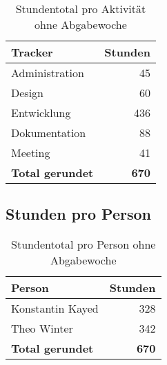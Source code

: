 \begin{table}[H]
\begin{center}
\begin{tabularx}{5.5cm}{ l | r }
\textbf{Tracker} & \textbf{Stunden} \\ \hline
Administration   & 45 \\ \hline
Design  & 60 \\ \hline
Entwicklung & 436 \\ \hline
Dokumentation & 88  \\ \hline
Meeting & 41  \\ \hline
\textbf{Total gerundet} & \textbf{670}  \\ \hline
\end{tabularx}
\caption{Stundentotal pro Aktivität ohne Abgabewoche}
\label{table:tperact}
\end{center}
\end{table}

\subsection{Stunden pro Person}
\label{sec:perperson}

\begin{table}[H]
\begin{center}
\begin{tabularx}{5.5cm}{ l | r }
\textbf{Person} & \textbf{Stunden} \\ \hline
Konstantin Kayed   & 328 \\ \hline
Theo Winter & 342 \\ \hline
\textbf{Total gerundet} & \textbf{670}  \\ \hline
\end{tabularx}
\caption{Stundentotal pro Person ohne Abgabewoche}
\label{table:tperact}
\end{center}
\end{table}
\pagebreak